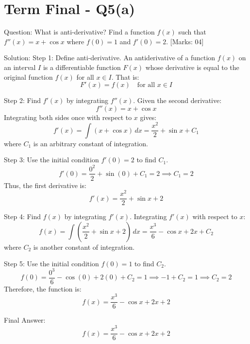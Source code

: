 \documentclass[11pt, a4paper]{article}
\begin{document}


\section*{Term Final - Q5(a)}

Question:
What is anti-derivative? Find a function $f(x)$ such that $f''(x) = x + \cos x$ where $f(0) = 1$ and $f'(0) = 2$. [Marks: 04]

Solution:
Step 1: Define anti-derivative.
An antiderivative of a function $f(x)$ on an interval $I$ is a differentiable function $F(x)$ whose derivative is equal to the original function $f(x)$ for all $x \in I$. That is:
\[
F'(x) = f(x) \quad \text{for all } x \in I
\]

Step 2: Find $f'(x)$ by integrating $f''(x)$.
Given the second derivative:
\[
f''(x) = x + \cos x
\]
Integrating both sides once with respect to $x$ gives:
\[
f'(x) = \int (x + \cos x) \, dx = \frac{x^2}{2} + \sin x + C_1
\]
where $C_1$ is an arbitrary constant of integration.

Step 3: Use the initial condition $f'(0) = 2$ to find $C_1$.
\[
f'(0) = \frac{0^2}{2} + \sin(0) + C_1 = 2 \implies C_1 = 2
\]
Thus, the first derivative is:
\[
f'(x) = \frac{x^2}{2} + \sin x + 2
\]

Step 4: Find $f(x)$ by integrating $f'(x)$.
Integrating $f'(x)$ with respect to $x$:
\[
f(x) = \int \left( \frac{x^2}{2} + \sin x + 2 \right) \, dx = \frac{x^3}{6} - \cos x + 2x + C_2
\]
where $C_2$ is another constant of integration.

Step 5: Use the initial condition $f(0) = 1$ to find $C_2$.
\[
f(0) = \frac{0^3}{6} - \cos(0) + 2(0) + C_2 = 1 \implies -1 + C_2 = 1 \implies C_2 = 2
\]
Therefore, the function is:
\[
f(x) = \frac{x^3}{6} - \cos x + 2x + 2
\]

Final Answer:
\[
\boxed{f(x) = \frac{x^3}{6} - \cos x + 2x + 2}
\]



\end{document}

